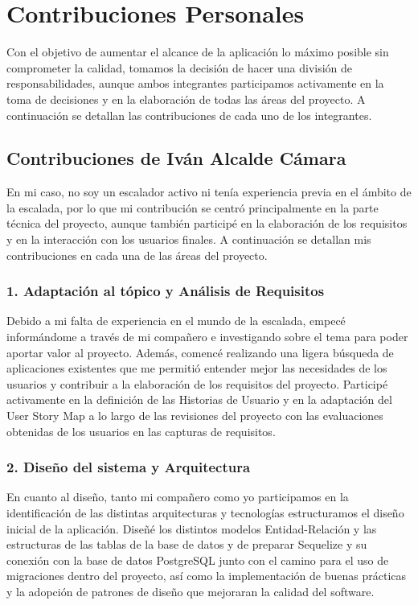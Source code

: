 \chapter*{Contribuciones Personales}
\label{cap:contribucionesPersonales}

Con el objetivo de aumentar el alcance de la aplicación lo máximo posible sin comprometer la calidad, tomamos la decisión de hacer una división de responsabilidades, aunque ambos integrantes participamos activamente en la toma de decisiones y en la elaboración de todas las áreas del proyecto. A continuación se detallan las contribuciones de cada uno de los integrantes.

\section*{Contribuciones de Iván Alcalde Cámara}
En mi caso, no soy un escalador activo ni tenía experiencia previa en el ámbito de la escalada, por lo que mi contribución se centró principalmente en la parte técnica del proyecto, aunque también participé en la elaboración de los requisitos y en la interacción con los usuarios finales. A continuación se detallan mis contribuciones en cada una de las áreas del proyecto.

\subsection*{1. Adaptación al tópico y Análisis de Requisitos}
Debido a mi falta de experiencia en el mundo de la escalada, empecé informándome a través de mi compañero e investigando sobre el tema para poder aportar valor al proyecto. Además, comencé realizando una ligera búsqueda de aplicaciones existentes que me permitió entender mejor las necesidades de los usuarios y contribuir a la elaboración de los requisitos del proyecto. Participé activamente en la definición de las Historias de Usuario y en la adaptación del User Story Map a lo largo de las revisiones del proyecto con las evaluaciones obtenidas de los usuarios en las capturas de requisitos.

\subsection*{2. Diseño del sistema y Arquitectura}
En cuanto al diseño, tanto mi compañero como yo participamos en la identificación de las distintas arquitecturas y tecnologías estructuramos el diseño inicial de la aplicación. Diseñé los distintos modelos Entidad-Relación y las estructuras de las tablas de la base de datos y de preparar Sequelize y su conexión con la base de datos PostgreSQL junto con el camino para el uso de migraciones dentro del proyecto, así como la implementación de buenas prácticas y la adopción de patrones de diseño que mejoraran la calidad del software.

